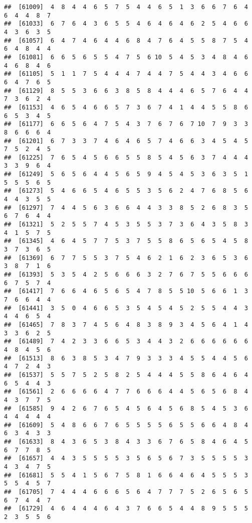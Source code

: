 \documentclass[
]{book}
\begin{document}
\begin{verbatim}
##  [61009]  4  8  4  4  6  5  7  5  4  4  6  5  1  3  6  6  7  6  4  6  4  4  8  7
##  [61033]  6  7  6  4  3  6  5  5  4  6  4  6  4  6  2  5  4  6  6  4  3  6  3  5
##  [61057]  6  4  7  4  6  4  4  6  8  4  7  6  4  5  5  8  7  5  4  6  4  8  4  4
##  [61081]  6  6  5  6  5  5  4  7  5  6 10  5  4  5  3  4  8  4  6  4  6  8  4  6
##  [61105]  5  1  1  7  5  4  4  4  7  4  4  7  5  4  4  3  4  6  6  6  4  7  6  5
##  [61129]  8  5  5  3  6  6  3  8  5  8  4  4  4  6  5  7  6  4  4  7  3  6  2  4
##  [61153]  4  6  5  4  6  6  5  7  3  6  7  4  1  4  4  5  5  8  6  6  5  3  4  5
##  [61177]  6  6  5  6  4  7  5  4  3  7  6  7  6  7 10  7  9  3  3  8  6  6  6  4
##  [61201]  6  7  3  3  7  4  6  4  6  5  7  4  6  6  3  4  5  4  5  7  5  2  4  5
##  [61225]  7  6  5  4  5  6  6  5  5  8  5  4  5  6  3  7  4  4  4  3  3  9  6  4
##  [61249]  5  6  5  6  4  4  5  6  5  9  4  5  4  5  3  6  3  5  1  5  5  5  6  5
##  [61273]  5  4  6  6  5  4  6  5  5  3  5  6  2  4  7  6  8  5  6  4  4  3  5  5
##  [61297]  7  4  4  5  6  3  6  6  4  4  3  3  8  5  2  6  8  3  5  6  7  6  4  4
##  [61321]  5  2  5  5  7  4  5  3  5  5  3  7  3  6  4  3  5  8  3  4  1  5  7  5
##  [61345]  4  6  4  5  7  7  5  3  7  5  5  8  6  5  6  5  4  5  8  3  7  3  6  5
##  [61369]  6  7  7  5  5  3  7  5  4  6  2  1  6  2  3  6  5  3  6  3  8  7  1  6
##  [61393]  5  3  5  4  2  5  6  6  6  3  2  7  6  7  5  5  6  6  6  6  7  5  7  4
##  [61417]  7  6  6  4  6  5  6  5  4  7  8  5  5 10  5  6  6  1  3  7  6  6  4  4
##  [61441]  3  5  0  4  6  6  5  3  5  4  5  4  5  2  5  5  4  4  3  4  4  6  5  4
##  [61465]  7  8  3  7  4  5  6  4  8  3  8  9  3  4  5  6  4  1  4  3  3  6  2  5
##  [61489]  7  4  2  3  3  6  6  5  3  4  4  3  2  6  6  6  6  6  6  4  8  4  5  6
##  [61513]  8  6  3  8  5  3  4  7  9  3  3  3  4  5  5  4  4  5  6  4  7  2  4  3
##  [61537]  5  5  7  5  2  5  8  2  5  4  4  4  5  5  8  6  4  6  4  6  5  4  4  3
##  [61561]  2  6  6  6  6  4  7  7  6  6  6  4  4  5  6  5  6  8  4  4  3  7  7  5
##  [61585]  9  4  2  6  7  6  5  4  5  6  4  5  6  8  5  4  5  3  6  4  4  4  4  4
##  [61609]  5  4  8  6  6  7  6  5  5  5  5  6  5  5  6  6  4  8  4  6  3  4  3  3
##  [61633]  8  4  3  6  5  3  8  4  3  3  6  7  6  5  8  4  6  4  5  6  7  7  8  5
##  [61657]  4  4  3  5  5  5  5  3  5  6  5  6  7  3  5  5  5  5  3  4  3  4  7  5
##  [61681]  5  5  4  1  5  6  7  5  8  1  6  6  4  6  4  5  5  5  3  5  5  4  5  7
##  [61705]  7  4  4  4  6  6  6  5  6  4  7  7  7  5  2  6  5  6  5  6  7  4  4  7
##  [61729]  4  6  4  4  4  6  4  3  7  6  6  5  4  4  8  9  5  5  5  2  3  5  5  6

\end{verbatim}
\end{document}
